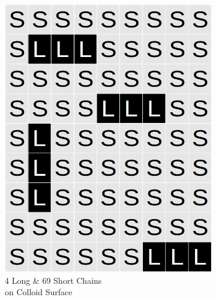 \documentclass[journal=jacsat,manuscript=article]{achemso}
\begin{document}
\begin{figure}[H]
\begin{subfigure}[b]{0.4\textwidth}
        \includegraphics[scale=0.15]{fig8e.png}
        \caption{4 Long \& 69 Short Chains\\ on Colloid Surface}
        \label{fig:E}
    \end{subfigure}
    \begin{subfigure}[b]{0.4\textwidth}

\end{subfigure}
\end{figure}
\end{document}
